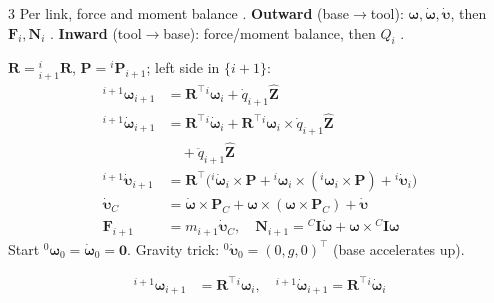 \begin{multicols}{3}
\label{w7:nepass}
Per link, force and moment balance . \textbf{Outward} (base$\to$tool): $\boldsymbol\omega,\dot{\boldsymbol\omega},\dot{\boldsymbol\upsilon}$, then $\mathbf F_i,\mathbf N_i$ . \textbf{Inward} (tool$\to$base): force/moment balance, then $Q_i$ .
\begin{fbx}[Outward, $i=0\to n{-}1$, revolute $i{+}1$ \added; $\hat{\mathbf Z}=(0,0,1)^\top$]
$\mathbf R={}^i_{i+1}\mathbf R$, $\mathbf P={}^i\mathbf P_{i+1}$; left side in $\{i{+}1\}$:
\begin{align*}
{}^{i+1}\boldsymbol\omega_{i+1}&=\mathbf R^\top{}^i\boldsymbol\omega_i+\dot q_{i+1}\hat{\mathbf Z}\\
{}^{i+1}\dot{\boldsymbol\omega}_{i+1}&=\mathbf R^\top{}^i\dot{\boldsymbol\omega}_i+\mathbf R^\top{}^i\boldsymbol\omega_i\times\dot q_{i+1}\hat{\mathbf Z}\\&\quad+\ddot q_{i+1}\hat{\mathbf Z}\\
{}^{i+1}\dot{\boldsymbol\upsilon}_{i+1}&=\mathbf R^\top\big({}^i\dot{\boldsymbol\omega}_i\times\mathbf P+{}^i\boldsymbol\omega_i\times({}^i\boldsymbol\omega_i\times\mathbf P)+{}^i\dot{\boldsymbol\upsilon}_i\big)\\
\dot{\boldsymbol\upsilon}_C&=\dot{\boldsymbol\omega}\times\mathbf P_C+\boldsymbol\omega\times(\boldsymbol\omega\times\mathbf P_C)+\dot{\boldsymbol\upsilon}\\
\mathbf F_{i+1}&=m_{i+1}\dot{\boldsymbol\upsilon}_C,\quad \mathbf N_{i+1}={}^C\mathbf I\dot{\boldsymbol\omega}+\boldsymbol\omega\times{}^C\mathbf I\boldsymbol\omega
\end{align*}
Start ${}^0\boldsymbol\omega_0=\dot{\boldsymbol\omega}_0=\mathbf 0$. Gravity trick: ${}^0\dot{\boldsymbol\upsilon}_0=(0,g,0)^\top$ (base accelerates up).
\end{fbx}
\begin{fbx}
\begin{align*}
{}^{i+1}\boldsymbol\omega_{i+1}&=\mathbf R^\top{}^i\boldsymbol\omega_i,\quad {}^{i+1}\dot{\boldsymbol\omega}_{i+1}=\mathbf R^\top{}^i\dot{\boldsymbol\omega}_i\\

\end{align*}
\end{fbx}
\end{multicols}
